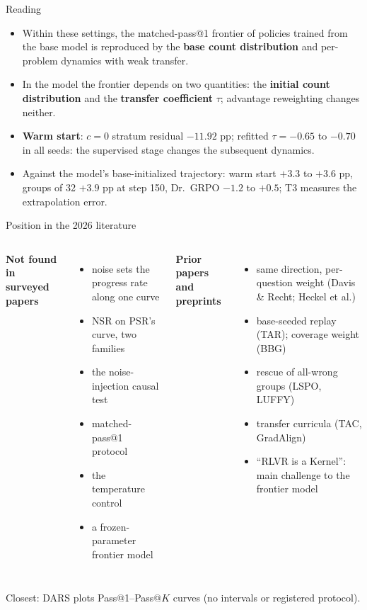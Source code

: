 \documentclass[aspectratio=169,11pt]{beamer}
\begin{document}
\begin{frame}{Reading}
\begin{itemize}
\item Within these settings, the matched-pass@1 frontier of policies trained from the base model is reproduced by the \textbf{base count distribution} and per-problem dynamics with weak transfer.
\item In the model the frontier depends on two quantities: the \textbf{initial count distribution} and the \textbf{transfer coefficient} $\tau$; advantage reweighting changes neither.
\item \textbf{Warm start}: $c=0$ stratum residual $-11.92$ pp; refitted $\tau=-0.65$ to $-0.70$ in all seeds: the supervised stage changes the subsequent dynamics.
\item Against the model's base-initialized trajectory: warm start $+3.3$ to $+3.6$ pp, groups of 32 $+3.9$ pp at step 150, Dr.\ GRPO $-1.2$ to $+0.5$; T3 measures the extrapolation error.
\end{itemize}
\end{frame}

\begin{frame}{Position in the 2026 literature}
\small
\begin{columns}[T]
\textbf{Not found in surveyed papers}
\begin{itemize}
\item noise sets the progress rate along one curve
\item NSR on PSR's curve, two families
\item the noise-injection causal test
\item matched-pass@1 protocol
\item the temperature control
\item a frozen-parameter frontier model
\end{itemize}
\textbf{Prior papers and preprints}
\begin{itemize}
\item same direction, per-question weight (Davis \& Recht; Heckel et al.)
\item base-seeded replay (TAR); coverage weight (BBG)
\item rescue of all-wrong groups (LSPO, LUFFY)
\item transfer curricula (TAC, GradAlign)
\item ``RLVR is a Kernel'': main challenge to the frontier model
\end{itemize}
\end{columns}
\vspace{4pt}
Closest: DARS plots Pass@1--Pass@$K$ curves (no intervals or registered protocol).
\end{frame}
\end{document}
